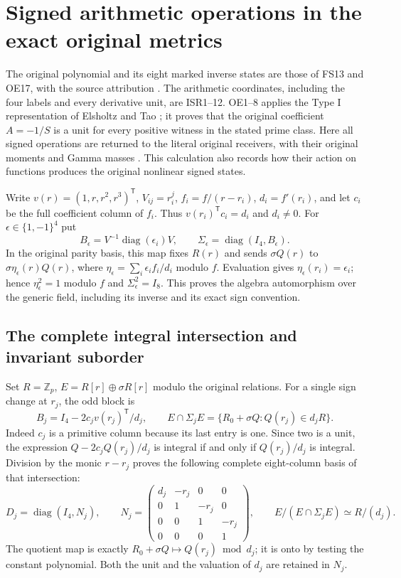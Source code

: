 \section{Signed arithmetic operations in the exact original metrics}
The original polynomial and its eight marked inverse states are those of
FS13 and OE17, with the source attribution \cite{ES488,Tao}. The arithmetic
coordinates, including the four labels and every derivative unit, are
ISR1--12. OE1--8 applies the Type I representation of
Elsholtz and Tao \cite[Section~2]{ElsholtzTao2015}; it proves that the
original coefficient $A=-1/S$ is a unit for every positive witness in
the stated prime class. Here all signed operations are returned to the
literal original receivers, with their original moments and Gamma masses
\cite{WCF}. This calculation also records how their action on functions
produces the original nonlinear signed states.

Write $v(r)=(1,r,r^2,r^3)^{\mathsf T}$, $V_{ij}=r_i^j$,
$f_i=f/(r-r_i)$, $d_i=f'(r_i)$, and let $c_i$ be the full coefficient
column of $f_i$. Thus $v(r_i)^{\mathsf T}c_i=d_i$ and $d_i\ne0$.
For $\epsilon\in\{1,-1\}^4$ put
\[
 B_\epsilon=V^{-1}\operatorname{diag}(\epsilon_i)V,
 \qquad \Sigma_\epsilon=\operatorname{diag}(I_4,B_\epsilon).
 \tag{SGR1}
\]
In the original parity basis, this map fixes $R(r)$ and sends
$\sigma Q(r)$ to $\sigma\eta_\epsilon(r)Q(r)$, where
$\eta_\epsilon=\sum_i\epsilon_i f_i/d_i$ modulo $f$.
Evaluation gives $\eta_\epsilon(r_i)=\epsilon_i$; hence
$\eta_\epsilon^2=1$ modulo $f$ and $\Sigma_\epsilon^2=I_8$.
This proves the algebra automorphism over the generic field, including
its inverse and its exact sign convention.

\subsection{The complete integral intersection and invariant suborder}
Set $R=\mathbb Z_p$, $E=R[r]\oplus\sigma R[r]$ modulo the original
relations. For a single sign change at $r_j$, the odd block is
\[
 B_j=I_4-2c_jv(r_j)^{\mathsf T}/d_j,
 \qquad
 E\cap\Sigma_jE
 =\{R_0+\sigma Q:Q(r_j)\in d_jR\}.
 \tag{SGR2}
\]
Indeed $c_j$ is a primitive column because its last entry is one.
Since two is a unit, the expression
$Q-2c_jQ(r_j)/d_j$ is integral if and only if $Q(r_j)/d_j$ is
integral. Division by the monic $r-r_j$ proves the following complete
eight-column basis of that intersection:
\[
 D_j=\operatorname{diag}(I_4,N_j),\qquad
 N_j=\begin{pmatrix}
 d_j&-r_j&0&0\\0&1&-r_j&0\\0&0&1&-r_j\\0&0&0&1
 \end{pmatrix},\qquad
 E/(E\cap\Sigma_jE)\simeq R/(d_j).
 \tag{SGR3}
\]
The quotient map is exactly $R_0+\sigma Q\mapsto Q(r_j)\bmod d_j$;
it is onto by testing the constant polynomial. Both the unit and the
valuation of $d_j$ are retained in $N_j$.

